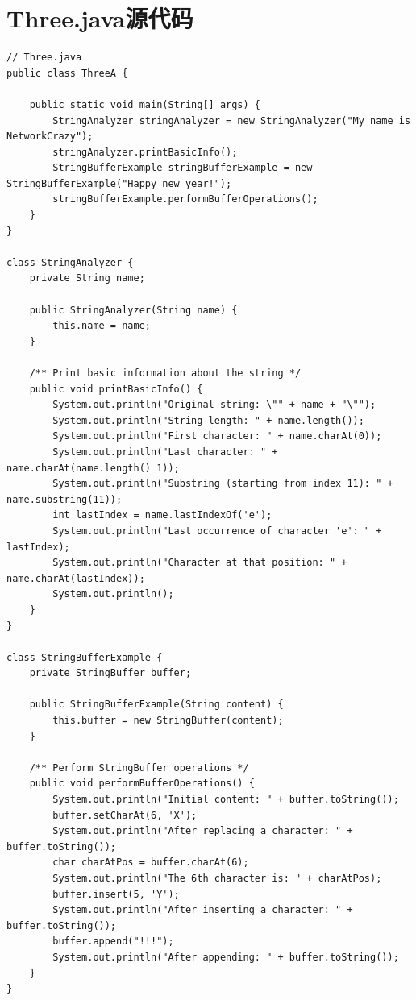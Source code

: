 \documentclass[12pt,a4paper]{article}
\begin{document}
\section*{Three.java源代码}\label{sec:three}
\begin{lstlisting}
// Three.java
public class ThreeA {

    public static void main(String[] args) {
        StringAnalyzer stringAnalyzer = new StringAnalyzer("My name is NetworkCrazy");
        stringAnalyzer.printBasicInfo();
        StringBufferExample stringBufferExample = new StringBufferExample("Happy new year!");
        stringBufferExample.performBufferOperations();
    }
}

class StringAnalyzer {
    private String name;

    public StringAnalyzer(String name) {
        this.name = name;
    }

    /** Print basic information about the string */
    public void printBasicInfo() {
        System.out.println("Original string: \"" + name + "\"");
        System.out.println("String length: " + name.length());
        System.out.println("First character: " + name.charAt(0));
        System.out.println("Last character: " + name.charAt(name.length() 1));
        System.out.println("Substring (starting from index 11): " + name.substring(11));
        int lastIndex = name.lastIndexOf('e');
        System.out.println("Last occurrence of character 'e': " + lastIndex);
        System.out.println("Character at that position: " + name.charAt(lastIndex));
        System.out.println();
    }
}

class StringBufferExample {
    private StringBuffer buffer;

    public StringBufferExample(String content) {
        this.buffer = new StringBuffer(content);
    }

    /** Perform StringBuffer operations */
    public void performBufferOperations() {
        System.out.println("Initial content: " + buffer.toString());
        buffer.setCharAt(6, 'X');
        System.out.println("After replacing a character: " + buffer.toString());
        char charAtPos = buffer.charAt(6);
        System.out.println("The 6th character is: " + charAtPos);
        buffer.insert(5, 'Y');
        System.out.println("After inserting a character: " + buffer.toString());
        buffer.append("!!!");
        System.out.println("After appending: " + buffer.toString());
    }
}
\end{lstlisting}
\end{document}
